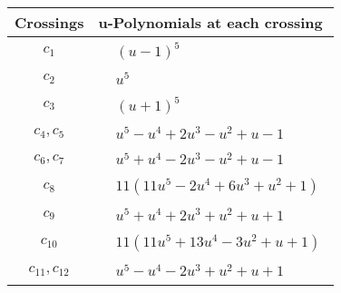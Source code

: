 \documentclass[1p]{elsarticle_modified}
\theoremstyle{definition}
\begin{document}
\begin{tabular}{m{50pt}|m{274pt}}
Crossings & \hspace{64pt}u-Polynomials at each crossing \\
\hline $$\begin{aligned}c_{1}\end{aligned}$$&$\begin{aligned}
&(u-1)^5
\end{aligned}$\\
\hline $$\begin{aligned}c_{2}\end{aligned}$$&$\begin{aligned}
&u^5
\end{aligned}$\\
\hline $$\begin{aligned}c_{3}\end{aligned}$$&$\begin{aligned}
&(u+1)^5
\end{aligned}$\\
\hline $$\begin{aligned}c_{4},c_{5}\end{aligned}$$&$\begin{aligned}
&u^5- u^4+2 u^3- u^2+u-1
\end{aligned}$\\
\hline $$\begin{aligned}c_{6},c_{7}\end{aligned}$$&$\begin{aligned}
&u^5+u^4-2 u^3- u^2+u-1
\end{aligned}$\\
\hline $$\begin{aligned}c_{8}\end{aligned}$$&$\begin{aligned}
&11(11 u^5-2 u^4+6 u^3+u^2+1)
\end{aligned}$\\
\hline $$\begin{aligned}c_{9}\end{aligned}$$&$\begin{aligned}
&u^5+u^4+2 u^3+u^2+u+1
\end{aligned}$\\
\hline $$\begin{aligned}c_{10}\end{aligned}$$&$\begin{aligned}
&11(11 u^5+13 u^4-3 u^2+u+1)
\end{aligned}$\\
\hline $$\begin{aligned}c_{11},c_{12}\end{aligned}$$&$\begin{aligned}
&u^5- u^4-2 u^3+u^2+u+1
\end{aligned}$\\
\hline
\end{tabular}\\~\\
\end{document}
